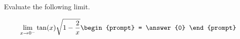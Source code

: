 \documentclass{ximera}
\author{Steven Gubkin}
\begin{document}
\begin{exercise}

Evaluate the following limit.

\[
\lim_{x \to 0^-} \tan(x) \sqrt{1 - \frac{2}{x}}   \begin{prompt} = \answer{0} \end{prompt}
\]

\end{exercise}
\end{document}
